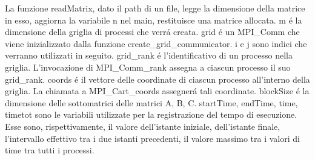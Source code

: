 La funzione readMatrix, dato il path di un file, legge la dimensione della matrice in esso, aggiorna la variabile n nel main, restituisce una matrice allocata.
m é la dimensione della griglia di processi che verrá creata.
grid é un MPI\_Comm che viene inizializzato dalla funzione create\_grid\_communicator.
i e j sono indici che verranno utilizzati in seguito.
grid\_rank é l'identificativo di un processo nella griglia.
L'invocazione di MPI\_Comm\_rank assegna a ciascun processo il suo grid\_rank.
coords é il vettore delle coordinate di ciascun processo all'interno della griglia.
La chiamata a MPI\_Cart\_coords assegnerá tali coordinate.
blockSize é la dimensione delle sottomatrici delle matrici A, B, C.
startTime, endTime, time, timetot sono le variabili utilizzate per la registrazione del tempo di esecuzione. Esse sono, rispettivamente, il valore dell'istante iniziale, dell'istante finale, l'intervallo effettivo tra i due istanti precedenti, il valore massimo tra i valori di time tra tutti i processi. 

